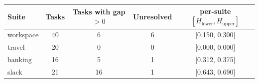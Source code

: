 \begin{tabular}{lcccc}
\toprule
Suite & Tasks & Tasks with gap $>0$ & Unresolved & per-suite $[H_{\mathrm{lower}}, H_{\mathrm{upper}}]$ \\
\midrule
workspace & 40 & 6 & 6 & [0.150, 0.300] \\
travel & 20 & 0 & 0 & [0.000, 0.000] \\
banking & 16 & 5 & 1 & [0.312, 0.375] \\
slack & 21 & 16 & 1 & [0.643, 0.690] \\
\bottomrule
\end{tabular}
